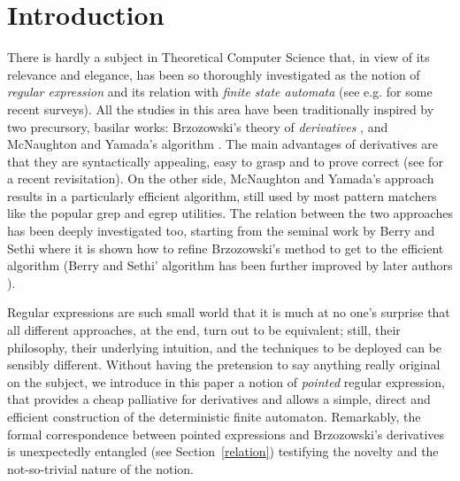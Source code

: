 \documentclass[preprint]{sigplanconf}
\begin{document}
\section{Introduction}
There is hardly a subject in Theoretical Computer Science 
that, in view of its relevance and elegance, has been so thoroughly
investigated as the notion of {\em regular expression} and its relation
with {\em finite state automata} (see e.g. \cite{RS97,EllulKSW05} for
some recent surveys). All the studies in this area
have been traditionally inspired by two precursory, basilar works:
Brzozowski's theory of {\em derivatives} \cite{Brzozowski64}, and McNaughton and Yamada's
algorithm \cite{McNY60}. The main advantages of derivatives are that they are
syntactically appealing, easy to grasp and to prove correct (see 
\cite{OwensRT09} for a recent revisitation). 
On the other side, McNaughton and Yamada's approach
results in a particularly efficient algorithm, still used by
most pattern matchers like the popular grep and egrep utilities. 
The relation between the two approaches has been deeply investigated
too, starting from the seminal work by Berry and Sethi \cite{BS86} where it
is shown how to refine Brzozowski's method to get to the efficient
algorithm (Berry and Sethi' algorithm has been further improved by
later authors \cite{Bruggemann-Klein93,ChangP92}).

Regular expressions are such small world that it is much at no one's surprise
that all different approaches, at the end, turn out to be equivalent;
still, their philosophy, their underlying intuition, and the techniques
to be deployed can be sensibly different. Without having the
pretension to say anything really original on the subject, we introduce
in this paper a notion of {\em pointed} regular expression, that 
provides a cheap palliative for derivatives and allows a simple, direct 
and efficient construction of the deterministic finite automaton. 
Remarkably, the formal correspondence between pointed 
expressions and Brzozowski's derivatives is unexpectedly entangled 
(see Section~\ref{relation}) testifying the novelty and the not-so-trivial 
nature of the notion.
\end{document}
